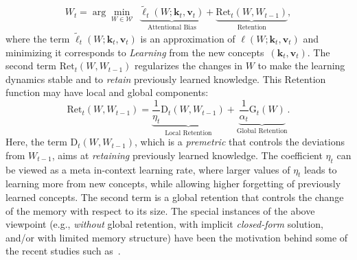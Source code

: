 \documentclass{article}
\newcommand{\citet}{\textcite}
\newcommand{\vk}[0]{\mathbf{k}}
\newcommand{\vvv}[0]{\mathbf{v}}
\newcommand{\cW}[0]{\mathcal{W}}
\newcommand{\undermath}[2]{\underset{#1}{\underbrace{#2}}}
\theoremstyle{plain}
\theoremstyle{definition}
\theoremstyle{remark}
\begin{document}
\begin{align}
\label{eq:Viewpoint2-Loss-Premetric}
\tag{Learning-Retaining Viewpoint}
  W_t = \arg\min_{W\in \cW} \:\: \undermath{\text{Attentional Bias}}{\widetilde{\ell}_t(W;\vk_t, \vvv_t)} + \undermath{\text{Retention}}{ \mbox{Ret}_t\left(W,W_{t-1}\right)},
\end{align}
where the term $\widetilde{\ell}_t(W;\vk_t, \vvv_t)$ is an approximation of $\ell(W;\vk_t, \vvv_t)$ and minimizing it corresponds to \textit{Learning} from the new concepts~$(\vk_t, \vvv_t)$.  The second term $\mbox{Ret}_t\left(W,W_{t-1}\right)$ regularizes the changes in $W$ to make the learning dynamics stable and to \textit{retain} previously learned knowledge. This Retention function may have local and global components:
\[
\mbox{Ret}_t\left(W,W_{t-1}\right) = \undermath{\text{Local Retention}}{\frac{1}{\eta_t} \mbox{D}_t\left(W,W_{t-1}\right)} + \undermath{\text{Global Retention}}{\frac{1}{\alpha_t} \mbox{G}_t\left(W\right)}.
\]
Here, the term $\mbox{D}_t\left(W,W_{t-1}\right)$, which is a \textit{premetric} that controls the deviations from $W_{t-1}$, aims at \textit{retaining} previously learned knowledge. The coefficient $\eta_t$ can be viewed as a meta in-context learning rate, where larger values of $\eta_t$ leads to learning more from new concepts, while allowing higher forgetting of previously learned concepts.  The second term is a global retention that controls the change of the memory with respect to its size. The special instances of the above viewpoint (e.g., \emph{without} global retention, with implicit \emph{closed-form} solution, and/or with limited memory structure) have been the motivation behind some of the recent studies such as~\citet{liu2024longhorn}.
\end{document}
